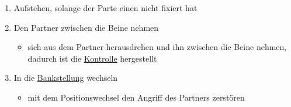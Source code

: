 \documentclass[justified, a4paper, notitlepage, captions=tableheading, nobib]{tufte-handout}
\begin{document}
\begin{itemize}
\begin{enumerate}
\item Aufstehen, solange der Parte einen nicht fixiert hat
\item Den Partner zwischen die Beine nehmen
\begin{itemize}
\item sich aus dem Partner herausdrehen und ihn zwischen die Beine nehmen, dadurch ist die \hyperref[org15bbf8e]{Kontrolle} hergestellt
\end{itemize}
\item In die \hyperref[orgd4877a8]{Bankstellung} wechseln
\begin{itemize}
\item mit dem Positionswechsel den Angriff des Partners zerstören
\end{itemize}
\end{enumerate}
\end{itemize}
\end{document}
